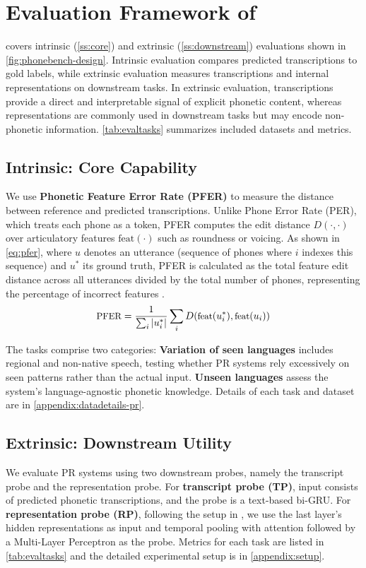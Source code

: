 

\section{Evaluation Framework of \bench}
\bench covers intrinsic (\autoref{ss:core}) and extrinsic (\autoref{ss:downstream}) evaluations shown in \autoref{fig:phonebench-design}. 
Intrinsic evaluation compares predicted transcriptions to gold labels, while extrinsic evaluation measures transcriptions and internal representations on downstream tasks.
In extrinsic evaluation, transcriptions provide a direct and interpretable signal of explicit phonetic content, whereas representations are commonly used in downstream tasks but may encode non-phonetic information.
\autoref{tab:evaltasks} summarizes included datasets and metrics.


\subsection{Intrinsic: Core Capability}\label{ss:core}
We use \textbf{Phonetic Feature Error Rate (PFER)} to measure the distance between reference and predicted transcriptions. 
Unlike Phone Error Rate (PER), which treats each phone as a token, PFER computes the edit distance $D(\cdot, \cdot)$ over articulatory features $\text{feat}(\cdot)$ such as roundness or voicing. As shown in \autoref{eq:pfer}, where $u$ denotes an utterance (sequence of phones where $i$ indexes this sequence) and $u^*$ its ground truth, PFER is calculated as the total feature edit distance across all utterances divided by the total number of phones, representing the percentage of incorrect features \cite{panphon}. 
\begin{equation}
\label{eq:pfer}\small
    \text{PFER} = \frac{1}{\sum_i |u_i^*|}\sum_i D(\text{feat}(u^*_i),\text{feat}(u_i))
\end{equation}

The tasks comprise two categories: 
\textbf{Variation of seen languages} includes regional and non-native speech, testing whether PR systems rely excessively on seen patterns rather than the actual input.
\textbf{Unseen languages} assess the system's language-agnostic phonetic knowledge. 
Details of each task and dataset are in \autoref{appendix:datadetails-pr}.


\subsection{Extrinsic: Downstream Utility}\label{ss:downstream}
We evaluate PR systems using two downstream probes, namely the transcript probe and the representation probe.
For \textbf{transcript probe (TP)}, input consists of predicted phonetic transcriptions, and the probe is a text-based bi-GRU.
For \textbf{representation probe (RP)}, following the setup in \citet{hear}, we use the last layer's hidden representations as input and temporal pooling with attention followed by a Multi-Layer Perceptron as the probe.
Metrics for each task are listed in \autoref{tab:evaltasks} and the detailed experimental setup is in \autoref{appendix:setup}.

